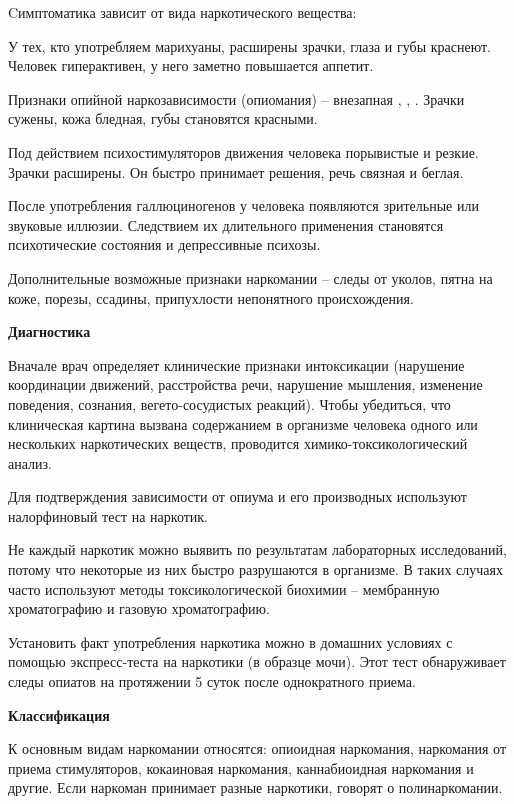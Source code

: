Cимптоматика зависит от вида наркотического вещества:

У тех, кто употребляем марихуаны, расширены зрачки, глаза и губы краснеют. Человек гиперактивен, у него заметно повышается аппетит.

Признаки опийной наркозависимости (опиомания) – внезапная , , . Зрачки сужены, кожа бледная, губы становятся красными.

Под действием психостимуляторов движения человека порывистые и резкие. Зрачки расширены. Он быстро принимает решения, речь связная и беглая.

После употребления галлюциногенов у человека появляются зрительные или звуковые иллюзии. Следствием их длительного применения становятся психотические состояния и депрессивные психозы.

Дополнительные возможные признаки наркомании – следы от уколов, пятна на коже, порезы, ссадины, припухлости непонятного происхождения.

\textbf{Диагностика}

Вначале врач определяет клинические признаки интоксикации (нарушение координации движений, расстройства речи, нарушение мышления, изменение поведения, сознания, вегето-сосудистых реакций). Чтобы убедиться, что клиническая картина вызвана содержанием в организме человека одного или нескольких наркотических веществ, проводится химико-токсикологический анализ.

Для подтверждения зависимости от опиума и его производных используют налорфиновый тест на наркотик.

Не каждый наркотик можно выявить по результатам лабораторных исследований, потому что некоторые из них быстро разрушаются в организме. В таких случаях часто используют методы токсикологической биохимии – мембранную хроматографию и газовую хроматографию.

Установить факт употребления наркотика можно в домашних условиях с помощью экспресс-теста на наркотики (в образце мочи). Этот тест обнаруживает следы опиатов на протяжении 5 суток после однократного приема.


\textbf{Классификация}

К основным видам наркомании относятся: опиоидная наркомания, наркомания от приема стимуляторов, кокаиновая наркомания, каннабиоидная наркомания и другие.  Если наркоман принимает разные наркотики, говорят о полинаркомании.

